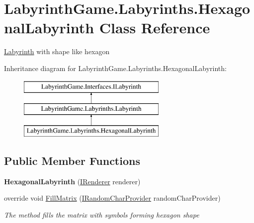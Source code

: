 \hypertarget{class_labyrinth_game_1_1_labyrinths_1_1_hexagonal_labyrinth}{\section{Labyrinth\+Game.\+Labyrinths.\+Hexagonal\+Labyrinth Class Reference}
\label{class_labyrinth_game_1_1_labyrinths_1_1_hexagonal_labyrinth}
}


\hyperlink{class_labyrinth_game_1_1_labyrinths_1_1_labyrinth}{Labyrinth} with shape like hexagon  


Inheritance diagram for Labyrinth\+Game.\+Labyrinths.\+Hexagonal\+Labyrinth\+:\begin{figure}[H]
\begin{center}
\leavevmode
\includegraphics[height=3.000000cm]{class_labyrinth_game_1_1_labyrinths_1_1_hexagonal_labyrinth}
\end{center}
\end{figure}
\subsection*{Public Member Functions}
\begin{DoxyCompactItemize}
\item 
\hypertarget{class_labyrinth_game_1_1_labyrinths_1_1_hexagonal_labyrinth_ac3f6de2b1b38148925b98f235d43767d}{{\bfseries Hexagonal\+Labyrinth} (\hyperlink{interface_labyrinth_game_1_1_interfaces_1_1_i_renderer}{I\+Renderer} renderer)}\label{class_labyrinth_game_1_1_labyrinths_1_1_hexagonal_labyrinth_ac3f6de2b1b38148925b98f235d43767d}

\item 
override void \hyperlink{class_labyrinth_game_1_1_labyrinths_1_1_hexagonal_labyrinth_af1d2c0c78d13dd85c421ded3dae0a062}{Fill\+Matrix} (\hyperlink{interface_labyrinth_game_1_1_interfaces_1_1_i_random_char_provider}{I\+Random\+Char\+Provider} random\+Char\+Provider)
\begin{DoxyCompactList}\small\item\em The method fills the matrix with symbols forming hexagon shape \end{DoxyCompactList}\end{DoxyCompactItemize}
